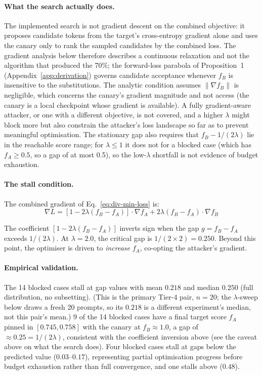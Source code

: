 \documentclass{article}
\begin{document}
\paragraph{What the search actually does.} The implemented search is not gradient descent on the combined objective: it proposes candidate tokens from the target's cross-entropy gradient alone and uses the canary only to rank the sampled candidates by the combined loss. The gradient analysis below therefore describes a continuous relaxation and not the algorithm that produced the 70\%; the forward-loss parabola of Proposition~1 (Appendix~\ref{app:derivation}) governs candidate acceptance whenever $f_B$ is insensitive to the substitutions. The analytic condition assumes $\|\nabla f_B\|$ is negligible, which concerns the canary's gradient magnitude and not access (the canary is a local checkpoint whose gradient is available). A fully gradient-aware attacker, or one with a different objective, is not covered, and a higher $\lambda$ might block more but also constrain the attacker's loss landscape so far as to prevent meaningful optimisation. The stationary gap also requires that $f_B - 1/(2\lambda)$ lie in the reachable score range; for $\lambda \leq 1$ it does not for a blocked case (which has $f_A \geq 0.5$, so a gap of at most 0.5), so the low-$\lambda$ shortfall is not evidence of budget exhaustion.

\paragraph{The stall condition.} The combined gradient of Eq.~\ref{eq:div-min-loss} is:
\begin{equation}
\label{eq:combined-gradient}
\nabla L = [1 - 2\lambda(f_B - f_A)] \cdot \nabla f_A + 2\lambda(f_B - f_A) \cdot \nabla f_B
\end{equation}

The coefficient $[1 - 2\lambda(f_B - f_A)]$ inverts sign when the gap $g = f_B - f_A$ exceeds $1/(2\lambda)$. At $\lambda = 2.0$, the critical gap is $1/(2 \times 2) = 0.250$. Beyond this point, the optimiser is driven to \emph{increase} $f_A$, co-opting the attacker's gradient.

\paragraph{Empirical validation.} The 14 blocked cases stall at gap values with mean $0.218$ and median $0.250$ (full distribution, no subsetting). (This is the primary Tier-4 pair, $n{=}20$; the $\lambda$-sweep below draws a fresh 20 prompts, so its $0.218$ is a different experiment's median, not this pair's mean.) 9 of the 14 blocked cases have a final target score $f_A$ pinned in $[0.745, 0.758]$ with the canary at $f_B \approx 1.0$, a gap of $\approx 0.25 = 1/(2\lambda)$, consistent with the coefficient inversion above (see the caveat above on what the search does). Four blocked cases stall at gaps below the predicted value ($0.03$--$0.17$), representing partial optimisation progress before budget exhaustion rather than full convergence, and one stalls above ($0.48$).
\end{document}
